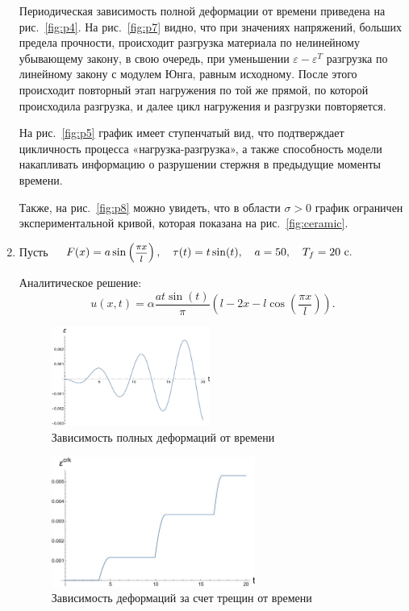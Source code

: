 \documentclass[12pt, a4paper]{article}
\begin{document}
\begin{enumerate}
  Периодическая зависимость полной деформации от времени приведена на рис.~\ref{fig:p4}.
  На рис.~\ref{fig:p7} видно, что при значениях
  напряжений, больших предела прочности, происходит разгрузка материала
  по нелинейному убывающему закону, в свою очередь, при уменьшении $\varepsilon-\varepsilon^T$ разгрузка по линейному закону с модулем Юнга, равным исходному. После этого происходит повторный этап нагружения по той же прямой, по которой происходила разгрузка, и далее цикл нагружения и разгрузки повторяется.
  
  На рис.~\ref{fig:p5} график имеет ступенчатый вид, что подтверждает цикличность процесса «нагрузка-разгрузка», а также способность модели накапливать информацию о разрушении стержня в предыдущие моменты времени.
  
Также, на рис.~\ref{fig:p8} можно увидеть, что в области $\sigma>0$ график ограничен экспериментальной кривой, которая показана на рис.~\ref{fig:ceramic}.

  	\item Пусть $\quad F(x) = a \sin\left(\hbox{\footnotesize$\displaystyle\frac{\pi x}{l}$}\right),\quad \tau(t) = t\sin(t),\quad a = 50,\quad T_f = 20 \text{ c}.$
  
  Аналитическое решение:
  \[
  u(x, t) = \alpha\frac{ a t \sin(t)}{\pi}\left(l-2x-l\cos\left(\frac{\pi x}{l}\right)\right).
  \]
  
  \begin{figure}[H]
  	\centering
  	\includegraphics[width=0.49\textwidth]{T1_1}
  	\caption{Зависимость полных деформаций от времени}
  \end{figure}
  
  \begin{figure}[H]
  	\centering
  	\includegraphics[width=0.63\textwidth]{T1_2}
  	\caption{Зависимость деформаций за счет трещин от времени}
  \end{figure}
  

\end{enumerate}
\end{document}
